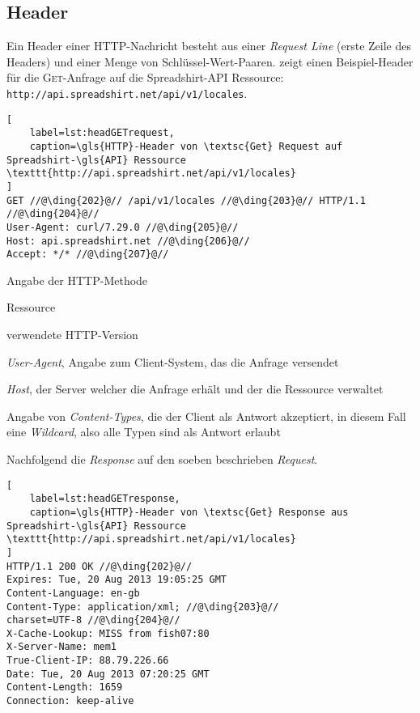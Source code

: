 
\subsection{Header}
\label{sec:http-header}

Ein Header einer \gls{HTTP}-Nachricht besteht aus einer \emph{Request Line} (erste Zeile des Headers) und einer Menge von Schlüssel-Wert-Paaren.  zeigt einen Beispiel-Header für die \textsc{Get}-Anfrage auf die Spreadshirt-\gls{API} Ressource:
\texttt{http://api.spreadshirt.net/api/v1/locales}.

\begin{lstlisting}[
    label=lst:headGETrequest,
    caption=\gls{HTTP}-Header von \textsc{Get} Request auf Spreadshirt-\gls{API} Ressource \texttt{http://api.spreadshirt.net/api/v1/locales}
]
GET //@\ding{202}@// /api/v1/locales //@\ding{203}@// HTTP/1.1 //@\ding{204}@//
User-Agent: curl/7.29.0 //@\ding{205}@//
Host: api.spreadshirt.net //@\ding{206}@//
Accept: */* //@\ding{207}@//
\end{lstlisting} 

\begin{compactitem}
    \item[\ding{202}] Angabe der \gls{HTTP}-Methode
    \item[\ding{203}] Ressource
    \item[\ding{204}] verwendete \gls{HTTP}-Version
    \item[\ding{205}] \emph{User-Agent}, Angabe zum Client-System, das die Anfrage versendet
    \item[\ding{206}] \emph{Host}, der Server welcher die Anfrage erhält und der die Ressource  verwaltet
    \item[\ding{207}] Angabe von \emph{Content-Types}, die der Client als Antwort akzeptiert, in diesem Fall eine \emph{Wildcard}, also alle Typen sind als Antwort erlaubt
\end{compactitem}

Nachfolgend die \emph{Response} auf den soeben beschrieben \emph{Request}.

\begin{lstlisting}[
    label=lst:headGETresponse,
    caption=\gls{HTTP}-Header von \textsc{Get} Response aus Spreadshirt-\gls{API} Ressource \texttt{http://api.spreadshirt.net/api/v1/locales}
]
HTTP/1.1 200 OK //@\ding{202}@//
Expires: Tue, 20 Aug 2013 19:05:25 GMT
Content-Language: en-gb
Content-Type: application/xml; //@\ding{203}@//
charset=UTF-8 //@\ding{204}@//
X-Cache-Lookup: MISS from fish07:80
X-Server-Name: mem1
True-Client-IP: 88.79.226.66
Date: Tue, 20 Aug 2013 07:20:25 GMT
Content-Length: 1659
Connection: keep-alive
\end{lstlisting}

